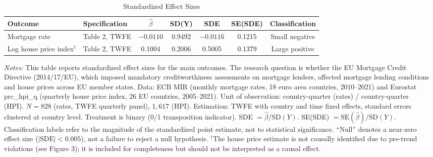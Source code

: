 \begin{table}[!h]
\centering
\caption{Standardized Effect Sizes}
\label{tab:sde}
\begin{adjustbox}{max width=\textwidth}
\begin{tabular}[t]{llccccc}
\toprule
Outcome & Specification & $\hat{\beta}$ & SD(Y) & SDE & SE(SDE) & Classification\\
\midrule
Mortgage rate & Table 2, TWFE & $-0.0110$ & 0.9492 & $-0.0116$ & 0.1215 & Small negative\\
Log house price index$^{\dagger}$ & Table 2, TWFE & 0.1004 & 0.2006 & 0.5005 & 0.1379 & Large positive\\
\bottomrule
\end{tabular}
\end{adjustbox}
\par\vspace{0.3em}
{\footnotesize \textit{Notes:} This table reports standardized effect sizes for the main outcomes. The research question is whether the EU Mortgage Credit Directive (2014/17/EU), which imposed mandatory creditworthiness assessments on mortgage lenders, affected mortgage lending conditions and house prices across EU member states. Data: ECB MIR (monthly mortgage rates, 18 euro area countries, 2010--2021) and Eurostat prc\_hpi\_q (quarterly house price index, 26 EU countries, 2005--2021). Unit of observation: country-quarter (rates) / country-quarter (HPI). $N = 828$ (rates, TWFE quarterly panel), $1{,}617$ (HPI). Estimation: TWFE with country and time fixed effects, standard errors clustered at country level. Treatment is binary (0/1 transposition indicator). SDE $= \hat{\beta} / \text{SD}(Y)$. SE(SDE) $= \text{SE}(\hat{\beta}) / \text{SD}(Y)$. Classification labels refer to the magnitude of the standardized point estimate, not to statistical significance. ``Null'' denotes a near-zero effect size ($|\text{SDE}| < 0.005$), not a failure to reject a null hypothesis. $^{\dagger}$The house price estimate is not causally identified due to pre-trend violations (see Figure 3); it is included for completeness but should not be interpreted as a causal effect.}
\end{table}
